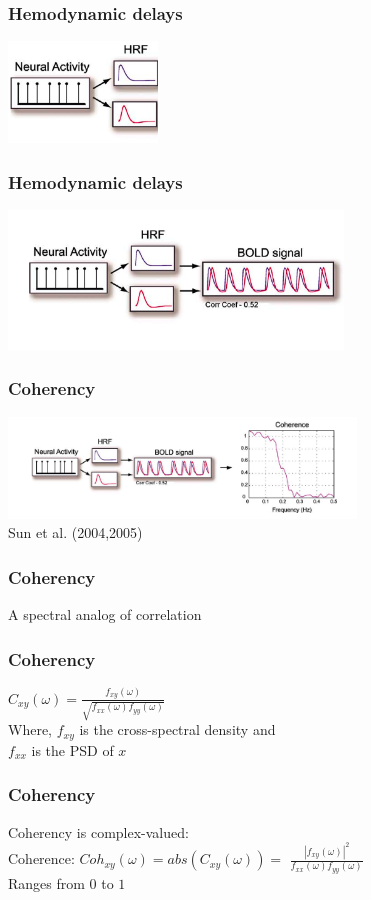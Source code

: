 \documentclass{beamer}
\begin{document}
\begin{frame}
\frametitle{Hemodynamic delays}
\includegraphics[height=2.7cm]{figures/hemo}
\end{frame}

\begin{frame}
\frametitle{Hemodynamic delays}
\includegraphics[height=3.7cm]{figures/tseries_w_hemo}
\end{frame}

\begin{frame}
\frametitle{Coherency}
\includegraphics[height=2.7cm]{figures/tseries_w_hemo_w_coh}
\\
\hfill
Sun et al. (2004,2005)
\end{frame}

\begin{frame}
\frametitle{Coherency}
A spectral analog of correlation
\end{frame}

\begin{frame}
\frametitle{Coherency}
$C_{xy}(\omega) = \frac{f_{xy}(\omega)}{\sqrt{f_{xx}(\omega)f_{yy}(\omega)}}$
\pause
\\
\vfill
Where, $f_{xy}$ is the cross-spectral density and 
\\
$f_{xx}$ is the PSD of $x$
\end{frame}

\begin{frame}
\frametitle{Coherency}
Coherency is complex-valued:
\\
\vfill
\pause
Coherence: $Coh_{xy} (\omega) = abs(C_{xy}(\omega)) = $
\pause
$\frac{|f_{xy}(\omega)|^2}{f_{xx}(\omega)f_{yy}(\omega)}$
\pause 
\\
\vfill
Ranges from $0$ to $1$
\end{frame}
\end{document}
